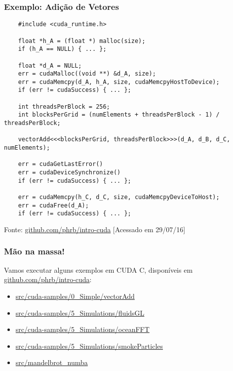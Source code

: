\documentclass[10pt, compress, aspectratio=43, xcolor={table,usenames,dvipsnames}]{beamer}
\begin{document}
\begin{frame}[fragile]
    \frametitle{Exemplo: Adição de Vetores}
    \begin{verbatim}
    #include <cuda_runtime.h>

    float *h_A = (float *) malloc(size);
    if (h_A == NULL) { ... };

    float *d_A = NULL;
    err = cudaMalloc((void **) &d_A, size);
    err = cudaMemcpy(d_A, h_A, size, cudaMemcpyHostToDevice);
    if (err != cudaSuccess) { ... };

    int threadsPerBlock = 256;
    int blocksPerGrid = (numElements + threadsPerBlock - 1) / threadsPerBlock;

    vectorAdd<<<blocksPerGrid, threadsPerBlock>>>(d_A, d_B, d_C, numElements);

    err = cudaGetLastError()
    err = cudaDeviceSynchronize()
    if (err != cudaSuccess) { ... };

    err = cudaMemcpy(h_C, d_C, size, cudaMemcpyDeviceToHost);
    err = cudaFree(d_A);
    if (err != cudaSuccess) { ... };
    \end{verbatim}

    \vfill

    \begin{center}
        \tiny{Fonte: \url{github.com/phrb/intro-cuda} [Acessado em 29/07/16]}
    \end{center}
\end{frame}

\begin{frame}
    \frametitle{Mão na massa!}
    Vamos executar alguns exemplos em CUDA C,
    disponíveis em \url{github.com/phrb/intro-cuda}:
    \begin{itemize}
        \item \url{src/cuda-samples/0_Simple/vectorAdd}
        \item \url{src/cuda-samples/5_Simulations/fluidsGL}
        \item \url{src/cuda-samples/5_Simulations/oceanFFT}
        \item \url{src/cuda-samples/5_Simulations/smokeParticles}
        \item \url{src/mandelbrot_numba}
    \end{itemize}
\end{frame}
\end{document}
